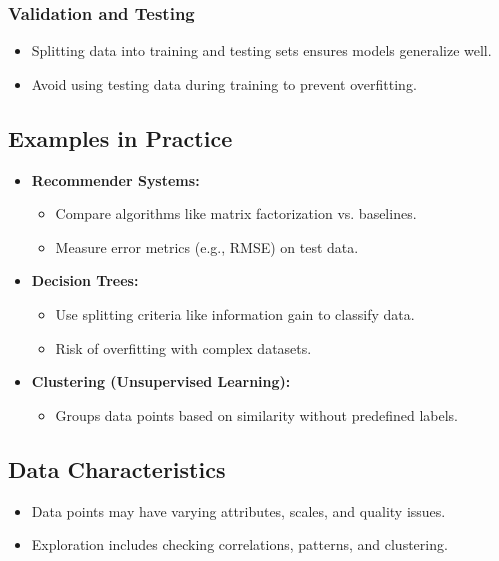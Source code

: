 \subsubsection{Validation and Testing}
\begin{itemize}
    \item Splitting data into training and testing sets ensures models generalize well.
    \item Avoid using testing data during training to prevent overfitting.
\end{itemize}

\subsection{Examples in Practice}
\begin{itemize}
    \item \textbf{Recommender Systems:}
    \begin{itemize}
        \item Compare algorithms like matrix factorization vs. baselines.
        \item Measure error metrics (e.g., RMSE) on test data.
    \end{itemize}
    \item \textbf{Decision Trees:}
    \begin{itemize}
        \item Use splitting criteria like information gain to classify data.
        \item Risk of overfitting with complex datasets.
    \end{itemize}
    \item \textbf{Clustering (Unsupervised Learning):}
    \begin{itemize}
        \item Groups data points based on similarity without predefined labels.
    \end{itemize}
\end{itemize}

\subsection{Data Characteristics}
\begin{itemize}
    \item Data points may have varying attributes, scales, and quality issues.
    \item Exploration includes checking correlations, patterns, and clustering.
\end{itemize}

